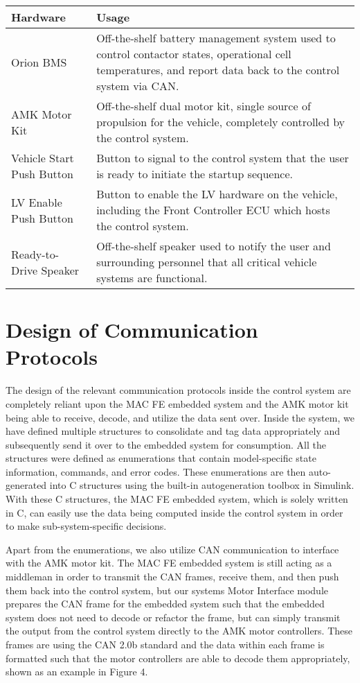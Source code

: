 \documentclass[12pt, titlepage]{article}
\newcommand{\ReqColA}{0.13\textwidth}
\newcommand{\ReqColB}{0.82\textwidth}
\begin{document}
\begin{tabular}{| p{\ReqColA} | p{\ReqColB} |}
\hline
\rowcolor[gray]{0.9}
Hardware & Usage\\
\hline
Orion BMS & Off-the-shelf battery management system used to control contactor states, operational cell temperatures, and report data back to the control system via CAN.\\
\hline
AMK Motor Kit & Off-the-shelf dual motor kit, single source of propulsion for the vehicle, completely controlled by the control system.\\
\hline
Vehicle Start Push Button & Button to signal to the control system that the user is ready to initiate the startup sequence.\\
\hline
LV Enable Push Button & Button to enable the LV hardware on the vehicle, including the Front Controller ECU which hosts the control system.\\
\hline
Ready-to-Drive Speaker & Off-the-shelf speaker used to notify the user and surrounding personnel that all critical vehicle systems are functional.\\
\hline
\end{tabular}

\section{Design of Communication Protocols}
The design of the relevant communication protocols inside the control system are completely reliant upon the MAC FE embedded system and the AMK motor kit being able to receive, decode, and utilize the data sent over. Inside the system, we have defined multiple structures to consolidate and tag data appropriately and subsequently send it over to the embedded system for consumption. All the structures were defined as enumerations that contain model-specific state information, commands, and error codes. These enumerations are then auto-generated into C structures using the built-in autogeneration toolbox in Simulink. With these C structures, the MAC FE embedded system, which is solely written in C, can easily use the data being computed inside the control system in order to make sub-system-specific decisions.

Apart from the enumerations, we also utilize CAN communication to interface with the AMK motor kit. The MAC FE embedded system is still acting as a middleman in order to transmit the CAN frames, receive them, and then push them back into the control system, but our systems Motor Interface module prepares the CAN frame for the embedded system such that the embedded system does not need to decode or refactor the frame, but can simply transmit the output from the control system directly to the AMK motor controllers. These frames are using the CAN 2.0b standard and the data within each frame is formatted such that the motor controllers are able to decode them appropriately, shown as an example in Figure 4.
\end{document}
